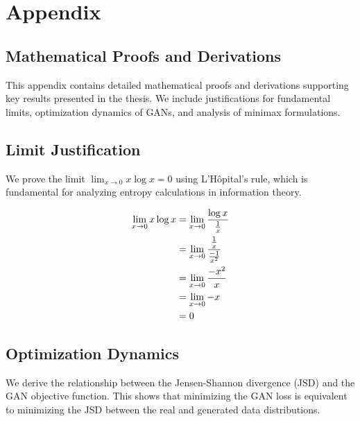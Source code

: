 \section{Appendix}
\subsection{Mathematical Proofs and Derivations}

This appendix contains detailed mathematical proofs and derivations supporting key results presented in the thesis. We include justifications for fundamental limits, optimization dynamics of GANs, and analysis of minimax formulations.

\subsection{Limit Justification}
\label{sec:limit-justification}
We prove the limit $\lim_{x \to 0} x\log{x} = 0$ using L'Hôpital's rule, which is fundamental for analyzing entropy calculations in information theory.

\begin{align}
	\label{justification:lhospital}
	\lim_{x \to 0} x\log{x} & = \lim_{x \to 0} {\log{x} \over {1 \over x}}        \\
	                        & = \lim_{x \to 0} {{1 \over x} \over {-1 \over x^2}} \\
	                        & = \lim_{x \to 0} {-x^2 \over x}                     \\
	                        & = \lim_{x \to 0} -x                                 \\
	                        & = 0
\end{align}

\subsection{Optimization Dynamics}
\label{sec:proof-for-jsd-thing}
We derive the relationship between the Jensen-Shannon divergence (JSD) and the GAN objective function. This shows that minimizing the GAN loss is equivalent to minimizing the JSD between the real and generated data distributions.

